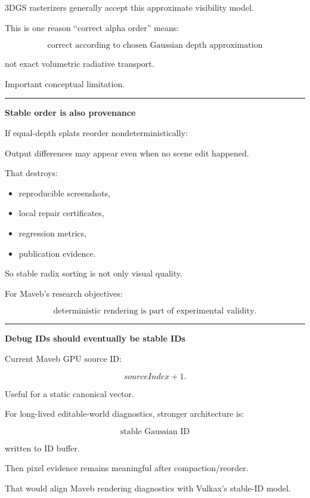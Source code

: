 3DGS rasterizers generally accept this approximate visibility model.

This is one reason ``correct alpha order'' means:

\[
\boxed{
\text{correct according to chosen Gaussian depth approximation}
}
\]

not exact volumetric radiative transport.

Important conceptual limitation.

\begin{center}\rule{0.5\linewidth}{0.5pt}\end{center}

\textbf{Stable order is also provenance}

If equal-depth splats reorder nondeterministically:

Output differences may appear even when no scene edit happened.

That destroys:

\begin{itemize}
\tightlist
\item
  reproducible screenshots,
\item
  local repair certificates,
\item
  regression metrics,
\item
  publication evidence.
\end{itemize}

So stable radix sorting is not only visual quality.

For Maveb's research objectives:

\[
\boxed{
\text{deterministic rendering is part of experimental validity}.
}
\]

\begin{center}\rule{0.5\linewidth}{0.5pt}\end{center}

\textbf{Debug IDs should eventually be stable IDs}

Current Maveb GPU source ID:

\[
sourceIndex+1.
\]

Useful for a static canonical vector.

For long-lived editable-world diagnostics, stronger architecture is:

\[
\boxed{
\text{stable Gaussian ID}
}
\]

written to ID buffer.

Then pixel evidence remains meaningful after compaction/reorder.

That would align Maveb rendering diagnostics with Vulkax's stable-ID model.

